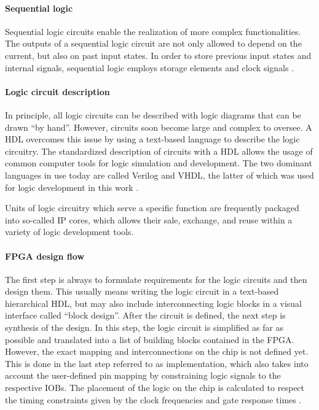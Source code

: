 \paragraph{Sequential logic}
Sequential logic circuits enable the realization of more complex functionalities. The outputs of a sequential logic circuit are not only allowed to depend on the current, but also on past input states. In order to store previous input states and internal signals, sequential logic employs storage elements and clock signals \cite{FPGA-LogicCircuitsVHDL}.
\paragraph{Logic circuit description}
In principle, all logic circuits can be described with logic diagrams that can be drawn \enquote{by hand}. However, circuits soon become large and complex to oversee. A \ac{HDL} overcomes this issue by using a text-based language to describe the logic circuitry. The standardized description of circuits with a \ac{HDL} allows the usage of common computer tools for logic simulation and development. The two dominant languages in use today are called Verilog and \ac{VHDL}, the latter of which was used for logic development in this work \cite{FPGA-LogicCircuitsVHDL}.
\par Units of logic circuitry which serve a specific function are frequently packaged into so-called \acp{IP core}, which allows their sale, exchange, and reuse within a variety of logic development tools.
\paragraph{FPGA design flow}
The first step is always to formulate requirements for the logic circuits and then design them. This usually means writing the logic circuit in a text-based hierarchical \ac{HDL}, but may also include interconnecting logic blocks in a visual interface called \enquote{block design}. After the circuit is defined, the next step is synthesis of the design. In this step, the logic circuit is simplified as far as possible and translated into a list of building blocks contained in the \ac{FPGA}. However, the exact mapping and interconnections on the chip is not defined yet. This is done in the last step referred to as implementation, which also takes into account the user-defined pin mapping by constraining logic signals to the respective \acp{IOB}. The placement of the logic on the chip is calculated to respect the timing constraints given by the clock frequencies and gate response times \cite{PhD-Eliseev}.



